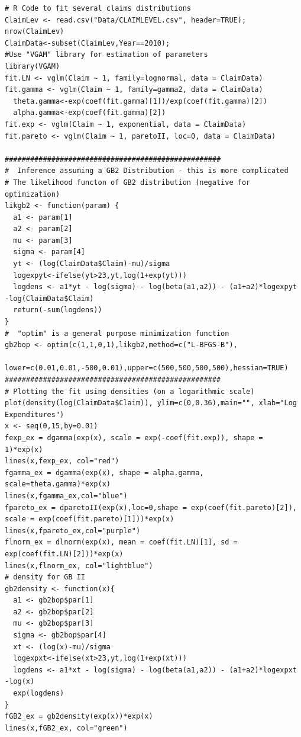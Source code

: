 \documentclass[]{book}
\theoremstyle{definition}
\theoremstyle{definition}
\theoremstyle{definition}
\theoremstyle{remark}
\begin{document}
\hypertarget{display.FitClaimDistn.2}{}
\begin{verbatim}
# R Code to fit several claims distributions
ClaimLev <- read.csv("Data/CLAIMLEVEL.csv", header=TRUE); nrow(ClaimLev)
ClaimData<-subset(ClaimLev,Year==2010); 
#Use "VGAM" library for estimation of parameters 
library(VGAM)
fit.LN <- vglm(Claim ~ 1, family=lognormal, data = ClaimData)
fit.gamma <- vglm(Claim ~ 1, family=gamma2, data = ClaimData)
  theta.gamma<-exp(coef(fit.gamma)[1])/exp(coef(fit.gamma)[2]) 
  alpha.gamma<-exp(coef(fit.gamma)[2])
fit.exp <- vglm(Claim ~ 1, exponential, data = ClaimData)
fit.pareto <- vglm(Claim ~ 1, paretoII, loc=0, data = ClaimData)

###################################################
#  Inference assuming a GB2 Distribution - this is more complicated
# The likelihood functon of GB2 distribution (negative for optimization)
likgb2 <- function(param) {
  a1 <- param[1]
  a2 <- param[2]
  mu <- param[3]
  sigma <- param[4]
  yt <- (log(ClaimData$Claim)-mu)/sigma
  logexpyt<-ifelse(yt>23,yt,log(1+exp(yt)))
  logdens <- a1*yt - log(sigma) - log(beta(a1,a2)) - (a1+a2)*logexpyt -log(ClaimData$Claim) 
  return(-sum(logdens))
}
#  "optim" is a general purpose minimization function
gb2bop <- optim(c(1,1,0,1),likgb2,method=c("L-BFGS-B"),
                lower=c(0.01,0.01,-500,0.01),upper=c(500,500,500,500),hessian=TRUE)
###################################################
# Plotting the fit using densities (on a logarithmic scale)
plot(density(log(ClaimData$Claim)), ylim=c(0,0.36),main="", xlab="Log Expenditures")
x <- seq(0,15,by=0.01)
fexp_ex = dgamma(exp(x), scale = exp(-coef(fit.exp)), shape = 1)*exp(x)
lines(x,fexp_ex, col="red")
fgamma_ex = dgamma(exp(x), shape = alpha.gamma, scale=theta.gamma)*exp(x)
lines(x,fgamma_ex,col="blue")
fpareto_ex = dparetoII(exp(x),loc=0,shape = exp(coef(fit.pareto)[2]), scale = exp(coef(fit.pareto)[1]))*exp(x)
lines(x,fpareto_ex,col="purple")
flnorm_ex = dlnorm(exp(x), mean = coef(fit.LN)[1], sd = exp(coef(fit.LN)[2]))*exp(x)
lines(x,flnorm_ex, col="lightblue")
# density for GB II
gb2density <- function(x){
  a1 <- gb2bop$par[1]
  a2 <- gb2bop$par[2]
  mu <- gb2bop$par[3]
  sigma <- gb2bop$par[4]
  xt <- (log(x)-mu)/sigma
  logexpxt<-ifelse(xt>23,yt,log(1+exp(xt)))
  logdens <- a1*xt - log(sigma) - log(beta(a1,a2)) - (a1+a2)*logexpxt -log(x) 
  exp(logdens)
}
fGB2_ex = gb2density(exp(x))*exp(x)
lines(x,fGB2_ex, col="green")
\end{verbatim}


\end{document}
